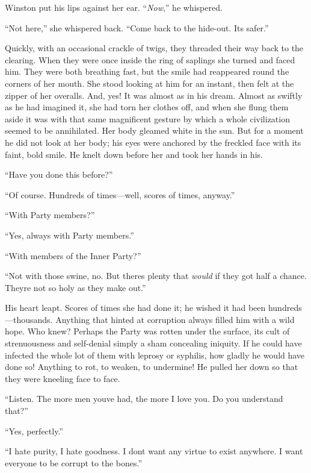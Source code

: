 Winston put his lips against her ear. ``\emph{Now},'' he whispered.

``Not here,'' she whispered back. ``Come back to the hide-out.
It\textquotesingle s safer.''

Quickly, with an occasional crackle of twigs, they threaded their way
back to the clearing. When they were once inside the ring of saplings
she turned and faced him. They were both breathing fast, but the smile
had reappeared round the corners of her mouth. She stood looking at him
for an instant, then felt at the zipper of her overalls. And, yes! It
was almost as in his dream. Almost as swiftly as he had imagined it, she
had torn her clothes off, and when she flung them aside it was with that
same magnificent gesture by which a whole civilization seemed to be
annihilated. Her body gleamed white in the sun. But for a moment he did
not look at her body; his eyes were anchored by the freckled face with
its faint, bold smile. He knelt down before her and took her hands in
his.

``Have you done this before?''

``Of course. Hundreds of times---well, scores of times, anyway.''

``With Party members?''

``Yes, always with Party members.''

``With members of the Inner Party?''

``Not with those swine, no. But there\textquotesingle s plenty that
\emph{would} if they got half a chance. They\textquotesingle re not so
holy as they make out.''

His heart leapt. Scores of times she had done it; he wished it had been
hundreds---thousands. Anything that hinted at corruption always filled
him with a wild hope. Who knew? Perhaps the Party was rotten under the
surface, its cult of strenuousness and self-denial simply a sham
concealing iniquity. If he could have infected the whole lot of them
with leprosy or syphilis, how gladly he would have done so! Anything to
rot, to weaken, to undermine! He pulled her down so that they were
kneeling face to face.

``Listen. The more men you\textquotesingle ve had, the more I love you.
Do you understand that?''

``Yes, perfectly.''

``I hate purity, I hate goodness. I don\textquotesingle t want any virtue
to exist anywhere. I want everyone to be corrupt to the bones.''

